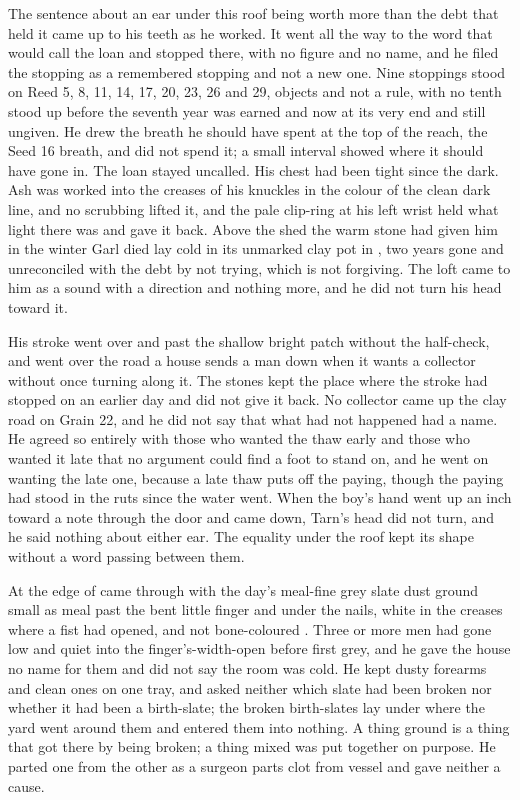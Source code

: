 The sentence about an ear under this roof being worth more than the debt that held it came up to his teeth as he worked. It went all the way to the word that would call the loan and stopped there, with no figure and no name, and he filed the stopping as a remembered stopping and not a new one. Nine stoppings stood on Reed 5, 8, 11, 14, 17, 20, 23, 26 and 29, objects and not a rule, with no tenth stood up before the seventh year was earned and now at its very end and still ungiven. He drew the breath he should have spent at the top of the reach, the Seed 16 breath, and did not spend it; a small interval showed where it should have gone in. The loan stayed uncalled. His chest had been tight since the dark. Ash was worked into the creases of his knuckles in the colour of the clean dark line, and no scrubbing lifted it, and the pale clip-ring at his left wrist held what light there was and gave it back. Above the shed the warm stone  had given him in the winter Garl died lay cold in its unmarked clay pot in , two years gone and unreconciled with the debt by not trying, which is not forgiving. The loft came to him as a sound with a direction and nothing more, and he did not turn his head toward it.

His stroke went over  and past the shallow bright patch without the half-check, and went over the road a house sends a man down when it wants a collector without once turning along it. The stones kept the place where the stroke had stopped on an earlier day and did not give it back. No collector came up the clay road on Grain 22, and he did not say that what had not happened had a name. He agreed so entirely with those who wanted the thaw early and those who wanted it late that no argument could find a foot to stand on, and he went on wanting the late one, because a late thaw puts off the paying, though the paying had stood in the ruts since the water went. When the boy's hand went up an inch toward a note through the door and came down, Tarn's head did not turn, and he said nothing about either ear. The equality under the roof kept its shape without a word passing between them.

\scenebreak

At the edge of   came through with the day's meal-fine grey slate dust ground small as meal past the bent little finger and under the nails, white in the creases where a fist had opened, and not bone-coloured . Three or more men had gone low and quiet into the finger's-width-open  before first grey, and he gave the house no name for them and did not say the room was cold. He kept dusty forearms and clean ones on one tray, and asked neither which slate had been broken nor whether it had been a birth-slate; the broken birth-slates lay under  where the yard went around them and entered them into nothing. A thing ground is a thing that got there by being broken; a thing mixed was put together on purpose. He parted one from the other as a surgeon parts clot from vessel and gave neither a cause.

